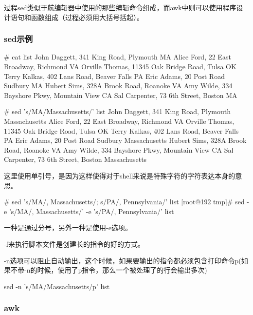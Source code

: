 过程sed类似于航编辑器中使用的那些编辑命令组成，而awk中则可以使用程序设计语句和函数组成（过程必须用大括号括起）。


\subsubsection{sed示例}
\begin{Command-Line}# cat list
John Daggett, 341 King Road, Plymouth MA
Alice Ford, 22 East Broadway, Richmond VA
Orville Thomas, 11345 Oak Bridge Road, Tulsa OK
Terry Kalkas, 402 Lans Road, Beaver Falls PA
Eric Adams, 20 Post Road Sudbury MA
Hubert Sims, 328A Brook Road, Roanoke VA
Amy Wilde, 334 Bayshore Pkwy, Mountain View CA
Sal Carpenter, 73 6th Street, Boston MA
\end{Command-Line}

\begin{Command-Line}# sed 's/MA/Massachusetts/' list
John Daggett, 341 King Road, Plymouth Massachusetts
Alice Ford, 22 East Broadway, Richmond VA
Orville Thomas, 11345 Oak Bridge Road, Tulsa OK
Terry Kalkas, 402 Lans Road, Beaver Falls PA
Eric Adams, 20 Post Road Sudbury Massachusetts
Hubert Sims, 328A Brook Road, Roanoke VA
Amy Wilde, 334 Bayshore Pkwy, Mountain View CA
Sal Carpenter, 73 6th Street, Boston Massachusetts
\end{Command-Line}

这里使用单引号，是因为这样使得对于shell来说是特殊字符的字符表达本身的意思。

\begin{Command-Line}# sed 's/MA/, Massachusetts/; s/PA/, Pennsylvania/' list
[root@192 tmp]# sed -e 's/MA/, Massachusetts/' -e 's/PA/, Pennsylvania/' list
\end{Command-Line}

一种是通过分号，另外一种是使用-e选项。

-f来执行脚本文件是创建长的指令的好的方式。

-n选项可以阻止自动输出，这个时候，如果要输出的指令都必须包含打印命令p(如果不带-n的时候，使用了p指令，那么一个被处理了的行会输出多次)

\begin{Command-Line}
sed -n 's/MA/Massachusetts/p' list
\end{Command-Line}

\subsubsection{awk}

